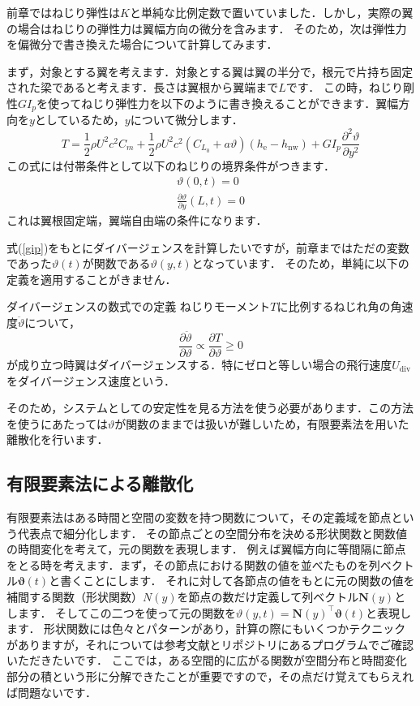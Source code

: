 \documentclass{jarticle}
\begin{document}
前章ではねじり弾性は$K$と単純な比例定数で置いていました．しかし，実際の翼の場合はねじりの弾性力は翼幅方向の微分を含みます．
そのため，次は弾性力を偏微分で書き換えた場合について計算してみます．

まず，対象とする翼を考えます．対象とする翼は翼の半分で，根元で片持ち固定された梁であると考えます．長さは翼根から翼端まで$L$です．
この時，ねじり剛性$GI_p$を使ってねじり弾性力を以下のように書き換えることができます．翼幅方向を$y$としているため，$y$について微分します．
\begin{equation} \label{gip}
    T = \frac{1}{2}\rho U^2 c^2 C_m + \frac{1}{2}\rho U^2 c^2 (C_{L_0} + a\vartheta)  (h_\mathrm{e}-h_\mathrm{nw}) + GI_p \frac{\partial^2 \vartheta}{\partial y^2}
\end{equation}
この式には付帯条件として以下のねじりの境界条件がつきます．
\begin{align}
    \vartheta(0,t) = 0 \\
    \frac{\partial \vartheta}{\partial y}(L,t) = 0
\end{align}
これは翼根固定端，翼端自由端の条件になります．

式(\ref{gip})をもとにダイバージェンスを計算したいですが，前章まではただの変数であった$\vartheta(t)$が関数である$\vartheta(y,t)$となっています．
そのため，単純に以下の定義を適用することがきません．
\begin{itembox}[l]{ダイバージェンスの数式での定義}
    ねじりモーメント$T$に比例するねじれ角の角速度$\ddot{\vartheta}$について，
    \begin{equation*}
        \frac{\partial \ddot{\vartheta}}{\partial \vartheta} \propto \frac{\partial T}{\partial \vartheta} \geq 0
    \end{equation*}
    が成り立つ時翼はダイバージェンスする．特にゼロと等しい場合の飛行速度$U_\mathrm{div}$をダイバージェンス速度という．
\end{itembox}
そのため，システムとしての安定性を見る方法を使う必要があります．この方法を使うにあたっては$\vartheta$が関数のままでは扱いが難しいため，有限要素法を用いた離散化を行います．

\subsection{有限要素法による離散化}

有限要素法はある時間と空間の変数を持つ関数について，その定義域を節点という代表点で細分化します．
その節点ごとの空間分布を決める形状関数と関数値の時間変化を考えて，元の関数を表現します．
例えば翼幅方向に等間隔に節点をとる時を考えます．まず，その節点における関数の値を並べたものを列ベクトル$\bm{\vartheta}(t)$と書くことにします．
それに対して各節点の値をもとに元の関数の値を補間する関数（形状関数）$N(y)$を節点の数だけ定義して列ベクトル$\bm{N}(y)$とします．
そしてこの二つを使って元の関数を$\vartheta(y,t) = \bm{N}(y)^\top\bm{\vartheta}(t)$と表現します．
形状関数には色々とパターンがあり，計算の際にもいくつかテクニックがありますが，それについては参考文献とリポジトリにあるプログラムでご確認いただきたいです．
ここでは，ある空間的に広がる関数が空間分布と時間変化部分の積という形に分解できたことが重要ですので，その点だけ覚えてもらえれば問題ないです．
\end{document}
